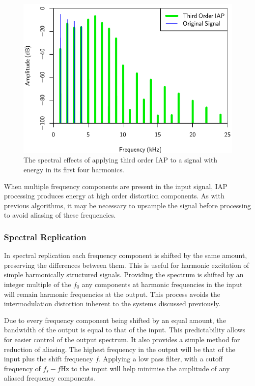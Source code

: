 			\begin{figure}[h!]
				\centering
				\includegraphics{chapter5/Images/IAP3Spectra.pdf}
				\caption{The spectral effects of applying third order IAP to a signal with energy in its 
				         first four harmonics.}
				\label{fig:IAP3Spectra}
			\end{figure}

			When multiple frequency components are present in the input signal, IAP processing produces energy
			at high order distortion components. As with previous algorithms, it may be necessary to upsample
			the signal before processing to avoid aliasing of these frequencies.

		\subsubsection*{Spectral Replication}
			In spectral replication each frequency component is shifted by the same amount, preserving the
			differences between them. This is useful for harmonic excitation of simple harmonically structured
			signals. Providing the spectrum is shifted by an integer multiple of the $f_{0}$ any components at
			harmonic frequencies in the input will remain harmonic frequencies at the output.  This process
			avoids the intermodulation distortion inherent to the systems discussed previously. 

			Due to every frequency component being shifted by an equal amount, the bandwidth of the output is
			equal to that of the input. This predictability allows for easier control of the output spectrum.
			It also provides a simple method for reduction of aliasing. The highest frequency in the output
			will be that of the input plus the shift frequency $f$. Applying a low pass filter, with a cutoff
			frequency of $f_{s} - f$Hz to the input will help minimise the amplitude of any aliased frequency
			components.

